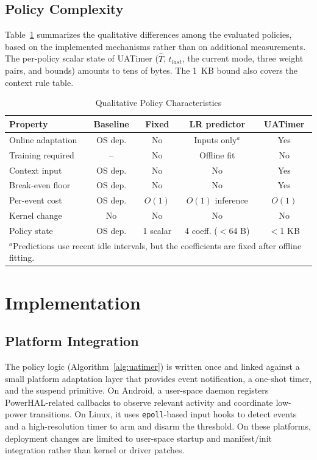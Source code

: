 \documentclass[journal]{IEEEtran}
\begin{document}
\subsection{Policy Complexity}
Table~\ref{tab:policycompare} summarizes the qualitative differences among the evaluated policies, based on the implemented mechanisms rather than on additional measurements. The per-policy scalar state of UATimer ($\hat T$, $t_{last}$, the current mode, three weight pairs, and bounds) amounts to tens of bytes. The 1~KB bound also covers the context rule table.

\begin{table}[t]
\caption{Qualitative Policy Characteristics}
\label{tab:policycompare}
\centering
\scriptsize
\setlength{\tabcolsep}{3pt}
\begin{tabular}{p{}cccc}
\toprule
Property & Baseline & Fixed & LR predictor & UATimer \\
\midrule
Online adaptation & OS dep. & No & Inputs only$^{a}$ & Yes \\
Training required & -- & No & Offline fit & No \\
Context input & OS dep. & No & No & Yes \\
Break-even floor & OS dep. & No & No & Yes \\
Per-event cost & OS dep. & $O(1)$ & $O(1)$ inference & $O(1)$ \\
Kernel change & No & No & No & No \\
Policy state & OS dep. & 1 scalar & 4 coeff. ($<$64 B) & $<$1 KB \\
\bottomrule
\multicolumn{5}{p{0.92\columnwidth}}{$^{a}$Predictions use recent idle intervals, but the coefficients are fixed after offline fitting.}
\end{tabular}
\end{table}

\section{Implementation}
\subsection{Platform Integration}
The policy logic (Algorithm~\ref{alg:uatimer}) is written once and linked against a small platform adaptation layer that provides event notification, a one-shot timer, and the suspend primitive. On Android, a user-space daemon registers PowerHAL-related callbacks to observe relevant activity and coordinate low-power transitions. On Linux, it uses \texttt{epoll}-based input hooks to detect events and a high-resolution timer to arm and disarm the threshold. On these platforms, deployment changes are limited to user-space startup and manifest/init integration rather than kernel or driver patches.
\end{document}
